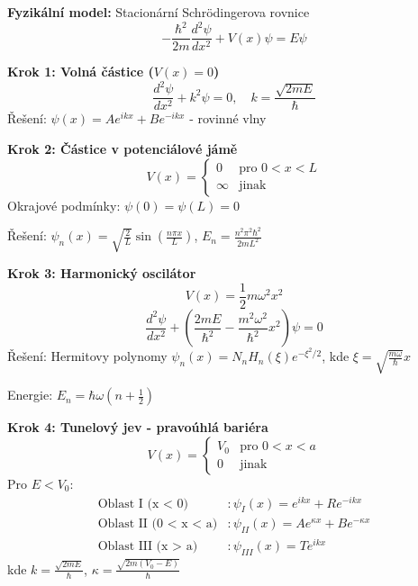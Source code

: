 \begin{example}
\label{ex:schrodingerova-rovnice}

\noindent\textbf{Fyzikální model:} Stacionární Schrödingerova rovnice
\[
-\frac{\hbar^2}{2m}\frac{d^2\psi}{dx^2} + V(x)\psi = E\psi
\]

\vspace{1.5\baselineskip}

\noindent\textbf{Krok 1: Volná částice ($V(x) = 0$)}
\[
\frac{d^2\psi}{dx^2} + k^2\psi = 0, \quad k = \frac{\sqrt{2mE}}{\hbar}
\]
Řešení: $\psi(x) = Ae^{ikx} + Be^{-ikx}$ - rovinné vlny

\vspace{1\baselineskip}

\noindent\textbf{Krok 2: Částice v potenciálové jámě}
\[
V(x) = \begin{cases}
0 & \text{pro } 0 < x < L \\
\infty & \text{jinak}
\end{cases}
\]
Okrajové podmínky: $\psi(0) = \psi(L) = 0$

Řešení: $\psi_n(x) = \sqrt{\frac{2}{L}}\sin\left(\frac{n\pi x}{L}\right)$, $E_n = \frac{n^2\pi^2\hbar^2}{2mL^2}$

\vspace{1\baselineskip}

\noindent\textbf{Krok 3: Harmonický oscilátor}
\[
V(x) = \frac{1}{2}m\omega^2 x^2
\]
\[
\frac{d^2\psi}{dx^2} + \left(\frac{2mE}{\hbar^2} - \frac{m^2\omega^2}{\hbar^2}x^2\right)\psi = 0
\]
Řešení: Hermitovy polynomy $\psi_n(x) = N_n H_n(\xi)e^{-\xi^2/2}$, kde $\xi = \sqrt{\frac{m\omega}{\hbar}}x$

Energie: $E_n = \hbar\omega\left(n + \frac{1}{2}\right)$

\vspace{1\baselineskip}

\noindent\textbf{Krok 4: Tunelový jev - pravoúhlá bariéra}
\[
V(x) = \begin{cases}
V_0 & \text{pro } 0 < x < a \\
0 & \text{jinak}
\end{cases}
\]
Pro $E < V_0$:
\begin{align*}
\text{Oblast I (x < 0)} &: \psi_I(x) = e^{ikx} + Re^{-ikx} \\
\text{Oblast II (0 < x < a)} &: \psi_{II}(x) = Ae^{\kappa x} + Be^{-\kappa x} \\
\text{Oblast III (x > a)} &: \psi_{III}(x) = Te^{ikx}
\end{align*}
kde $k = \frac{\sqrt{2mE}}{\hbar}$, $\kappa = \frac{\sqrt{2m(V_0 - E)}}{\hbar}$


\end{example}
